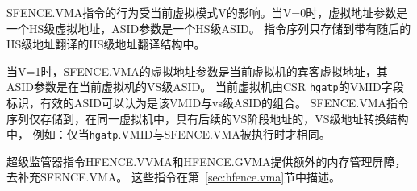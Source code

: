 SFENCE.VMA指令的行为受当前虚拟模式V的影响。当V=0时，虚拟地址参数是一个HS级虚拟地址，ASID参数是一个HS级ASID。
指令序列只存储到带有随后的HS级地址翻译的HS级地址翻译结构中。

当V=1时，SFENCE.VMA的虚拟地址参数是当前虚拟机的宾客虚拟地址，其ASID参数是在当前虚拟机的VS级ASID。
当前虚拟机由CSR {\tt hgatp}的VMID字段标识，有效的ASID可以认为是该VMID与vs级ASID的组合。
SFENCE.VMA指令序列仅存储到，在同一虚拟机中，具有后续的VS阶段地址的，VS级地址转换结构中，
例如：仅当{\tt hgatp}.VMID与SFENCE.VMA被执行时才相同。

超级监管器指令HFENCE.VVMA和HFENCE.GVMA提供额外的内存管理屏障，去补充SFENCE.VMA。
这些指令在第~\ref{sec:hfence.vma}节中描述。

